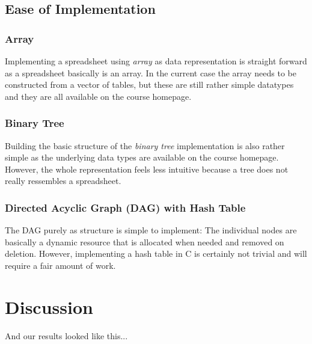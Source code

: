 \documentclass[a4paper,11pt,twoside]{article}
\begin{document}
\subsection{Ease of Implementation}
\subsubsection{Array}
Implementing a spreadsheet using \textit{array} as data representation
is straight forward as a spreadsheet basically is an array. In the
current case the array needs to be constructed from a vector of
tables, but these are still rather simple datatypes and they are all
available on the course homepage.

\subsubsection{Binary Tree}
Building the basic structure of the \textit{binary tree}
implementation is also rather simple as the underlying data
types are available on the course homepage. However, the whole
representation feels less intuitive because a tree does not really
ressembles a spreadsheet.

\subsubsection{Directed Acyclic Graph (DAG) with Hash Table}
The DAG purely as structure is simple to implement: The individual
nodes are basically a dynamic resource that is allocated when needed
and removed on deletion. However, implementing a hash table in C is
certainly not trivial and will require a fair amount of work. 

\section{Discussion}
And our results looked like this...



\end{document}
